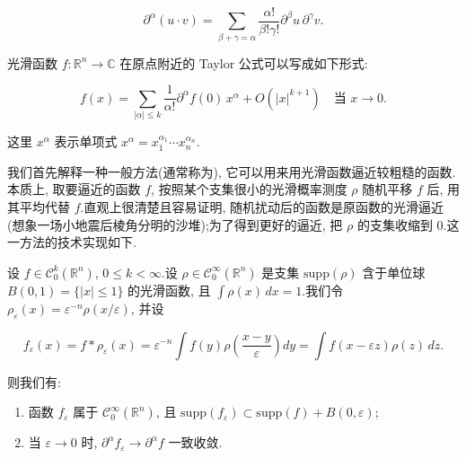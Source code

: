 \[
\partial^{\alpha}(u\cdot v) = \sum_{\beta+\gamma=\alpha}\frac{\alpha!}{\beta!\gamma!}\partial^{\beta}u\, \partial^{\gamma}v.
\]

光滑函数 $f : \mathbb{R}^n\to\mathbb{C}$ 在原点附近的 Taylor 公式可以写成如下形式:

\[
f(x) = \sum_{|\alpha|\leq k}\frac{1}{\alpha!}\partial^{\alpha}f(0)\, x^{\alpha} + O(|x|^{k+1}) \quad \text{当 } x\to 0.
\]

这里 $x^{\alpha}$ 表示单项式 $x^{\alpha} = x_1^{\alpha_1}\cdots x_n^{\alpha_n}$.

我们首先解释一种一般方法(通常称为), 它可以用来用光滑函数逼近较粗糙的函数.本质上, 取要逼近的函数 $f$, 按照某个支集很小的光滑概率测度 $\rho$ 随机平移 $f$ 后, 用其平均代替 $f$.直观上很清楚且容易证明, 随机扰动后的函数是原函数的光滑逼近(想象一场小地震后棱角分明的沙堆);为了得到更好的逼近, 把 $\rho$ 的支集收缩到 0.这一方法的技术实现如下.

\begin{proposition}\label{prop:c3-2.1}
设 $f\in\mathcal{C}_0^k(\mathbb{R}^n)$, $0\leq k<\infty$.设 $\rho\in\mathcal{C}_0^{\infty}(\mathbb{R}^n)$ 是支集 $\mathrm{supp}(\rho)$ 含于单位球 $B(0, 1) = \{|x|\leq 1\}$ 的光滑函数, 且 $\int\rho(x)\, dx = 1$.我们令 $\rho_{\varepsilon}(x) = \varepsilon^{-n}\rho(x/\varepsilon)$, 并设

\[
f_{\varepsilon}(x) = f*\rho_{\varepsilon}(x) = \varepsilon^{-n}\int f(y)\rho\left(\frac{x-y}{\varepsilon}\right)dy = \int f(x-\varepsilon z)\rho(z)\, dz.
\]

则我们有:

\begin{enumerate}
\item 函数 $f_{\varepsilon}$ 属于 $\mathcal{C}_0^{\infty}(\mathbb{R}^n)$, 且 $\mathrm{supp}(f_{\varepsilon})\subset\mathrm{supp}(f) + B(0, \varepsilon)$;
\item 当 $\varepsilon\to 0$ 时, $\partial^{\alpha}f_{\varepsilon}\longrightarrow\partial^{\alpha}f$ 一致收敛.
\end{enumerate}
\end{proposition}

